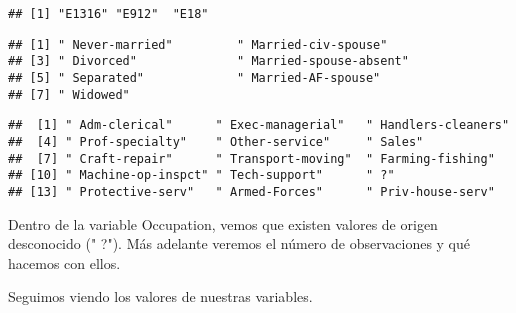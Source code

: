 \documentclass[]{article}
\newenvironment{Shaded}{\begin{snugshade}}{\end{snugshade}}
\newcommand{\DataTypeTok}[1]{\textcolor[rgb]{0.13,0.29,0.53}{#1}}
\newcommand{\KeywordTok}[1]{\textcolor[rgb]{0.13,0.29,0.53}{\textbf{#1}}}
\newcommand{\NormalTok}[1]{#1}
\newcommand{\OperatorTok}[1]{\textcolor[rgb]{0.81,0.36,0.00}{\textbf{#1}}}
\newcommand{\StringTok}[1]{\textcolor[rgb]{0.31,0.60,0.02}{#1}}
\begin{document}
\begin{Shaded}
\end{Shaded}

\begin{verbatim}
## [1] "E1316" "E912"  "E18"
\end{verbatim}

\begin{Shaded}
\end{Shaded}

\begin{verbatim}
## [1] " Never-married"         " Married-civ-spouse"   
## [3] " Divorced"              " Married-spouse-absent"
## [5] " Separated"             " Married-AF-spouse"    
## [7] " Widowed"
\end{verbatim}

\begin{Shaded}
\end{Shaded}

\begin{verbatim}
##  [1] " Adm-clerical"      " Exec-managerial"   " Handlers-cleaners"
##  [4] " Prof-specialty"    " Other-service"     " Sales"            
##  [7] " Craft-repair"      " Transport-moving"  " Farming-fishing"  
## [10] " Machine-op-inspct" " Tech-support"      " ?"                
## [13] " Protective-serv"   " Armed-Forces"      " Priv-house-serv"
\end{verbatim}

Dentro de la variable Occupation, vemos que existen valores de origen
desconocido (" ?"). Más adelante veremos el número de observaciones y
qué hacemos con ellos.

Seguimos viendo los valores de nuestras variables.

\begin{Shaded}
\end{Shaded}
\end{document}
